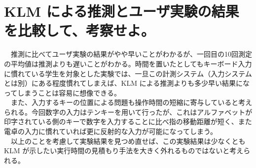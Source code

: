 \documentclass{scrartcl}
\begin{document}
\section{KLM による推測とユーザ実験の結果を比較して、考察せよ。}
\label{sec:org3ec9040}
　推測に比べてユーザ実験の結果がやや早いことがわかるが、一回目の10回測定の平均値は推測よりも遅いことがわかる。時間を置いたとしてもキーボード入力に慣れている学生を対象とした実験では、一旦この計測システム（入力システムとは別）にある程度慣れてしまえば、KLM による推測よりも多少早い結果になってしまうことは容易に想像できる。\\
　また、入力するキーの位置による問題も操作時間の短縮に寄与していると考えられる。今回数字の入力はテンキーを用いて行ったが、これはアルファベットが印字されている側のキーで数字を入力することに比べ指の移動距離が短く、また電卓の入力に慣れていれば更に反射的な入力が可能になってしまう。\\
　以上のことを考慮して実験結果を見つめ直せば、この実験結果は少なくとも KLM が示したい実行時間の見積もり手法を大きく外れるものではないと考えられる。\\
\end{document}
